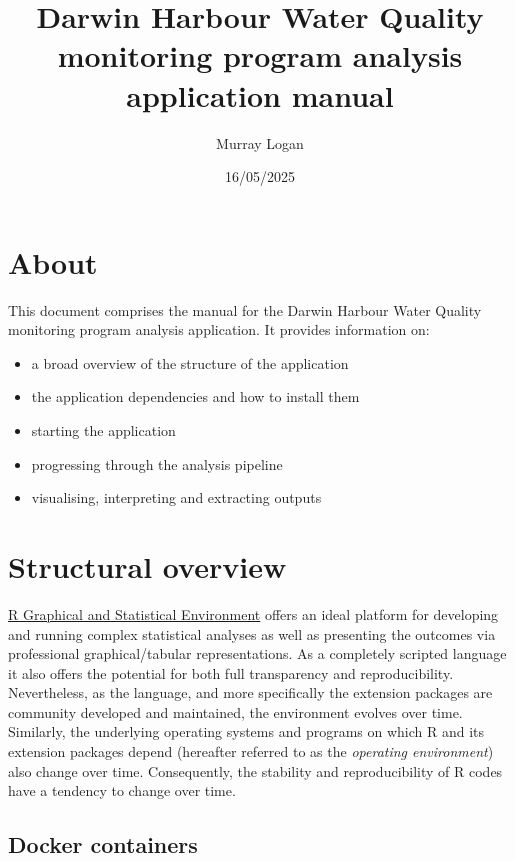 \documentclass[
  8pt,
  a4paper]{article}
\title{Darwin Harbour Water Quality monitoring program analysis
application manual}
\author{Murray Logan}
\date{16/05/2025}
\providecommand{\tightlist}{%
  \setlength{\itemsep}{0pt}\setlength{\parskip}{0pt}}
\renewcommand*\contentsname{Table of contents}
\newcommand\contentsname{Table of contents}
\begin{document}
\maketitle

\renewcommand*\contentsname{Table of contents}
{
\hypersetup{linkcolor=}
\setcounter{tocdepth}{3}
\tableofcontents
}

\section{About}\label{about}

This document comprises the manual for the Darwin Harbour Water Quality
monitoring program analysis application. It provides information on:

\begin{itemize}
\tightlist
\item
  a broad overview of the structure of the application
\item
  the application dependencies and how to install them
\item
  starting the application
\item
  progressing through the analysis pipeline
\item
  visualising, interpreting and extracting outputs
\end{itemize}

\section{Structural overview}\label{structural-overview}

\href{https://www.r-project.org/}{R Graphical and Statistical
Environment} offers an ideal platform for developing and running complex
statistical analyses as well as presenting the outcomes via professional
graphical/tabular representations. As a completely scripted language it
also offers the potential for both full transparency and
reproducibility. Nevertheless, as the language, and more specifically
the extension packages are community developed and maintained, the
environment evolves over time. Similarly, the underlying operating
systems and programs on which R and its extension packages depend
(hereafter referred to as the \emph{operating environment}) also change
over time. Consequently, the stability and reproducibility of R codes
have a tendency to change over time.

\subsection{Docker containers}\label{docker-containers}
\end{document}
